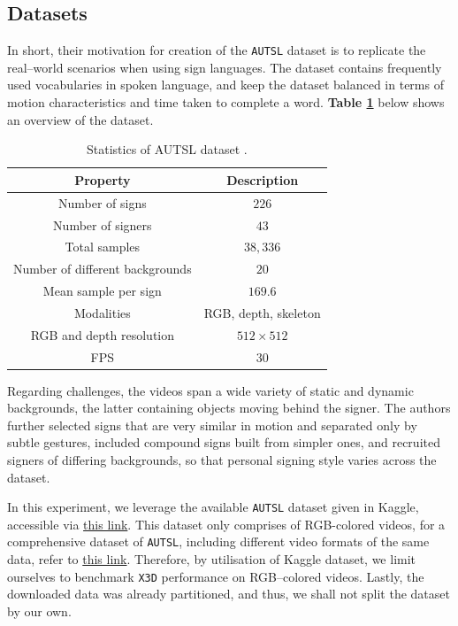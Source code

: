 \label{sec:experiment}

\subsection{Datasets}
In short, their motivation for creation of the \texttt{AUTSL} dataset is to replicate the real–world scenarios when using sign languages.
The dataset contains frequently used vocabularies in spoken language, and keep the dataset balanced in terms of motion characteristics and time taken to complete a word.
\textbf{Table \ref{tab:AUTSL_description}} below shows an overview of the dataset.

\begin{table}[H]
\centering\small
\begin{tabular}{@{}c c@{}}
\toprule
\textbf{Property} & \textbf{Description}  \\
\midrule
Number of signs & $226$  \\
Number of signers & $43$ \\
Total samples & $38,336$ \\
Number of diﬀerent backgrounds &  $20$ \\
Mean sample per sign & $169.6$ \\
Modalities & RGB, depth, skeleton \\
RGB and depth resolution & $512 \times 512$ \\
FPS & 30 \\
\bottomrule
\end{tabular}
\caption{Statistics of AUTSL dataset \cite{sincan2020autsl}.}
\label{tab:AUTSL_description}
\end{table}

Regarding challenges, the videos span a wide variety of static and dynamic backgrounds, the latter containing objects moving behind the signer.
The authors further selected signs that are very similar in motion and separated only by subtle gestures, included compound signs built from simpler ones, and recruited signers of differing backgrounds, so that personal signing style varies across the dataset.


In this experiment, we leverage the available \texttt{AUTSL} dataset given in Kaggle, accessible via \href{https://www.kaggle.com/datasets/sttaseen/autsl}{this link}.
This dataset only comprises of RGB-colored videos, for a comprehensive dataset of \texttt{AUTSL}, including different video formats of the same data, refer to \href{https://cvml.ankara.edu.tr/datasets/}{this link}.
Therefore, by utilisation of Kaggle dataset, we limit ourselves to benchmark \texttt{X3D} performance on RGB–colored videos. Lastly, the downloaded data was already partitioned, and thus, we shall not split the dataset by our own.

